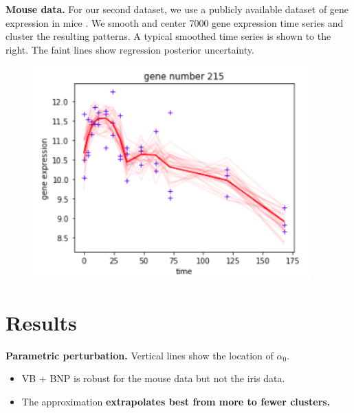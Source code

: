 \documentclass[a0,plainsections,30pt]{sciposter}\usepackage[]{graphicx}\usepackage[]{color}
\begin{document}
\begin{minipage}[t]{0.45\textwidth}
\begin{minipage}[t]{0.49\textwidth}
%
\textbf{Mouse data.} For our second dataset, we use a publicly available
dataset of gene expression in mice \citep{shoemaker:2015:ultrasensitive}. We
smooth and center 7000 gene expression time series and cluster the resulting
patterns.  A typical smoothed time series is shown to the right.  The faint
lines show regression posterior uncertainty.
%
\end{minipage}
%
\begin{minipage}[t]{0.49\textwidth}
\vspace{-0.8in}
\begin{figure}[!h]
\centering
\includegraphics[width = 0.95\textwidth]{./static_images/mouse_genes.png}
\end{figure}
\end{minipage}
%

\vspace{-0.6in}
\section*{Results}
\vspace{-0.3in}

\textbf{Parametric perturbation.} Vertical lines show the location of
$\alpha_0$.
\begin{itemize}
\item VB + BNP is robust for the mouse data but not the iris data.
\item The approximation \textbf{extrapolates best from more to fewer clusters.}
\end{itemize}


\end{minipage}
\end{document}
